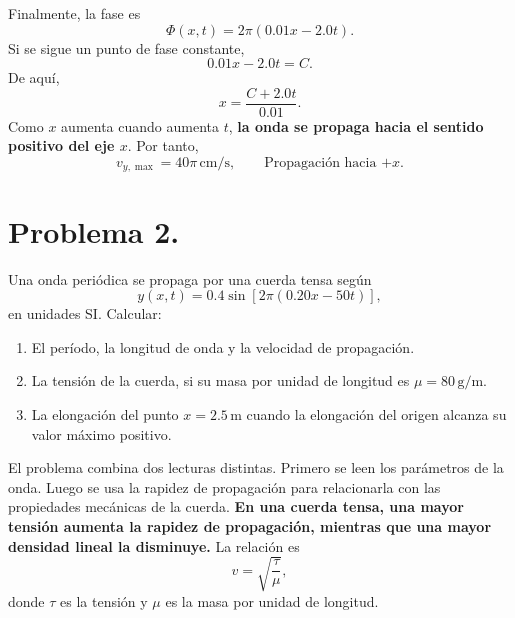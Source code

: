 \documentclass[11pt]{article}
\begin{document}
Finalmente, la fase es
\begin{equation*}
    \Phi(x,t)=2\pi(0.01x-2.0t).
\end{equation*}
Si se sigue un punto de fase constante,
\begin{equation*}
    0.01x-2.0t=C.
\end{equation*}
De aqu\'i,
\begin{equation*}
    x=\frac{C+2.0t}{0.01}.
\end{equation*}
Como $x$ aumenta cuando aumenta $t$, \textbf{la onda se propaga hacia el sentido positivo del eje $x$}. Por tanto,
\begin{equation*}
    \boxed{v_{y,\max}=40\pi\,\mathrm{cm/s}},
    \qquad
    \boxed{\text{Propagaci\'on hacia }{+x}}.
\end{equation*}

\clearpage

\section*{Problema 2.}
Una onda peri\'odica se propaga por una cuerda tensa seg\'un
\begin{equation*}
    y(x,t)=0.4\sin\left[2\pi(0.20x-50t)\right],
\end{equation*}
en unidades SI. Calcular:
\begin{enumerate}[label=(\alph*)]
    \item El per\'iodo, la longitud de onda y la velocidad de propagaci\'on.
    \item La tensi\'on de la cuerda, si su masa por unidad de longitud es $\mu=80\,\mathrm{g/m}$.
    \item La elongaci\'on del punto $x=2.5\,\mathrm{m}$ cuando la elongaci\'on del origen alcanza su valor m\'aximo positivo.
\end{enumerate}



El problema combina dos lecturas distintas. Primero se leen los par\'ametros de la onda. Luego se usa la rapidez de propagaci\'on para relacionarla con las propiedades mec\'anicas de la cuerda.
\textbf{En una cuerda tensa, una mayor tensi\'on aumenta la rapidez de propagaci\'on, mientras que una mayor densidad lineal la disminuye.} La relaci\'on es
\begin{equation*}
    v=\sqrt{\frac{\tau}{\mu}},
\end{equation*}
donde $\tau$ es la tensi\'on y $\mu$ es la masa por unidad de longitud.
\end{document}
